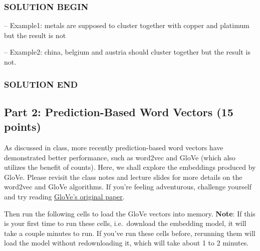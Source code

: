 \documentclass[11pt]{article}
\begin{document}
    \subsubsection{SOLUTION BEGIN}\label{solution-begin}

-- Example1: metals are supposed to cluster together with copper and
platimum but the result is not

-- Example2: china, belgium and austria should cluster together but the
result is not.

\subsubsection{SOLUTION END}\label{solution-end}

    \subsection{Part 2: Prediction-Based Word Vectors (15
points)}\label{part-2-prediction-based-word-vectors-15-points}

As discussed in class, more recently prediction-based word vectors have
demonstrated better performance, such as word2vec and GloVe (which also
utilizes the benefit of counts). Here, we shall explore the embeddings
produced by GloVe. Please revisit the class notes and lecture slides for
more details on the word2vec and GloVe algorithms. If you're feeling
adventurous, challenge yourself and try reading
\href{https://nlp.stanford.edu/pubs/glove.pdf}{GloVe's original paper}.

Then run the following cells to load the GloVe vectors into memory.
\textbf{Note}: If this is your first time to run these cells,
i.e.~download the embedding model, it will take a couple minutes to run.
If you've run these cells before, rerunning them will load the model
without redownloading it, which will take about 1 to 2 minutes.
\end{document}
